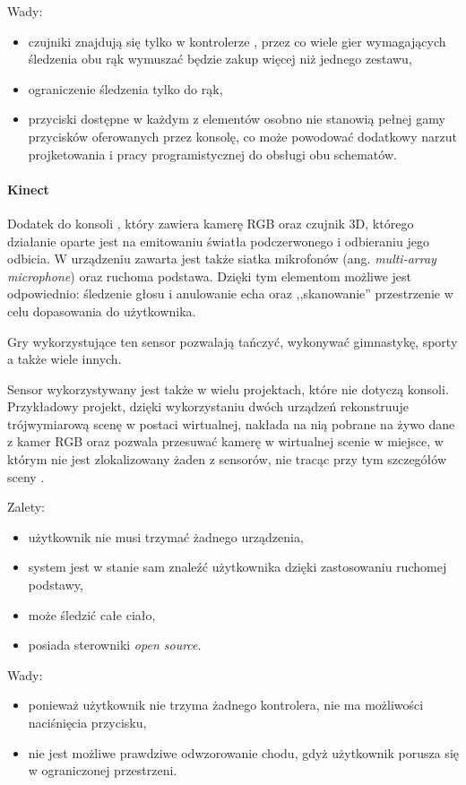 Wady:
\begin{itemize}
  \item czujniki znajdują się tylko w kontrolerze , przez co wiele gier wymagających śledzenia obu rąk wymuszać będzie zakup więcej niż jednego zestawu,
  \item ograniczenie śledzenia tylko do rąk,
  \item przyciski dostępne w każdym z elementów osobno nie stanowią pełnej gamy przycisków oferowanych przez konsolę, co może powodować dodatkowy narzut projketowania i pracy programistycznej do obsługi obu schematów.
\end{itemize}

\paragraph{Kinect}
Dodatek do konsoli , który zawiera kamerę RGB oraz czujnik 3D, którego działanie oparte jest na emitowaniu światła podczerwonego i odbieraniu jego odbicia. W urządzeniu zawarta jest także siatka mikrofonów (ang. \textsl{multi-array microphone}) oraz ruchoma podstawa. Dzięki tym elementom możliwe jest odpowiednio: śledzenie głosu i anulowanie echa oraz ,,skanowanie'' przestrzenie w celu dopasowania do użytkownika.

Gry wykorzystujące ten sensor pozwalają tańczyć, wykonywać gimnastykę, sporty a także wiele innych.

Sensor wykorzystywany jest także w wielu projektach, które nie dotyczą konsoli. Przykładowy projekt, dzięki wykorzystaniu dwóch urządzeń  rekonstruuje trójwymiarową scenę w postaci wirtualnej, nakłada na nią pobrane na żywo dane z kamer RGB oraz pozwala przesuwać kamerę w wirtualnej scenie w miejsce, w którym nie jest zlokalizowany żaden z sensorów, nie tracąc przy tym szczegółów sceny \citep{TwoKinects}.

Zalety:
\begin{itemize}
  \item użytkownik nie musi trzymać żadnego urządzenia,
  \item system jest w stanie sam znaleźć użytkownika dzięki zastosowaniu ruchomej podstawy,
  \item może śledzić całe ciało,
  \item posiada sterowniki \textsl{open source}.
\end{itemize}

Wady:
\begin{itemize}
  \item ponieważ użytkownik nie trzyma żadnego kontrolera, nie ma możliwości naciśnięcia przycisku,
  \item nie jest możliwe prawdziwe odwzorowanie chodu, gdyż użytkownik porusza się w ograniczonej przestrzeni.
\end{itemize}



